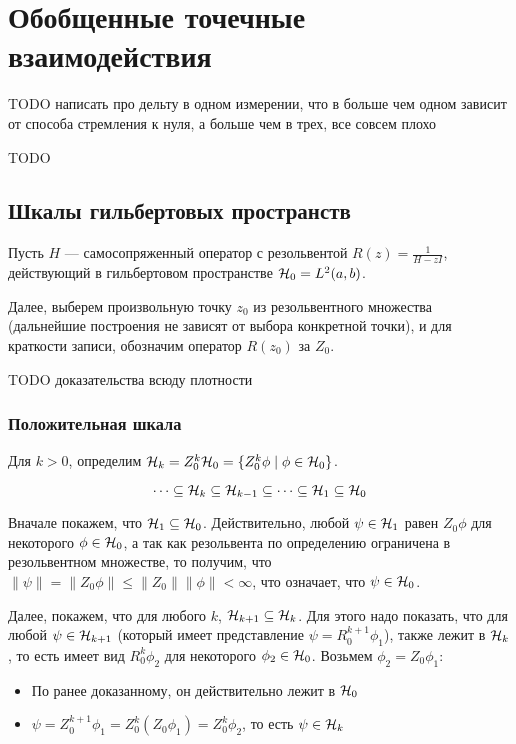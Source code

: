 \section{Обобщенные точечные взаимодействия}

TODO написать про дельту в одном измерении, что в больше чем одном зависит от способа стремления к нуля, а больше чем в трех, все совсем плохо

TODO
\subsection{Шкалы гильбертовых пространств}
Пусть $H$ — самосопряженный оператор с резольвентой $R(z) = \frac{1}{H - z I}$, действующий в гильбертовом пространстве $\mathcal{H}_{0} = L^2(a, b)$.

Далее, выберем произвольную точку $z_0$ из резольвентного множества (дальнейшие построения не зависят от выбора конкретной точки), и для краткости записи, обозначим оператор $R(z_0)$ за $Z_0$.


TODO доказательства всюду плотности
\subsubsection{Положительная шкала}
Для $k > 0$, определим $\mathcal{H}_{k} = Z_0^k \mathcal{H}_{0} = \{ Z_0^k \phi \mid \phi \in \mathcal{H}_{0} \}$.

\begin{prop}
\[
\dots \subseteq \mathcal{H}_{k} \subseteq \mathcal{H}_{k - 1} \subseteq \dots \subseteq \mathcal{H}_{1} \subseteq{\mathcal{H}_{0}}
\]
\end{prop}
Вначале покажем, что $\mathcal{H}_{1} \subseteq \mathcal{H}_{0}$. Действительно, любой $\psi \in \mathcal{H}_{1}$ равен $Z_0 \phi$ для некоторого $\phi \in \mathcal{H}_{0}$, а так как резольвента по определению ограничена в резольвентном множестве, то получим, что $\| \psi \| = \| Z_0 \phi \| \le \|Z_0\| \|\phi\| < \infty$, что означает, что $\psi \in \mathcal{H}_{0}$.

Далее, покажем, что для любого $k$, $\mathcal{H}_{k + 1} \subseteq \mathcal{H}_{k}$. Для этого надо показать, что для любой $\psi \in \mathcal{H}_{k + 1}$ (который имеет представление $\psi = R_0^{k + 1} \phi_1$), также лежит в $\mathcal{H}_{k}$, то есть имеет вид $R_0^k \phi_2$ для некоторого $\phi_2 \in \mathcal{H}_{0}$. Возьмем $\phi_2 = Z_0 \phi_1$:
\begin{itemize}
\item По ранее доказанному, он действительно лежит в $\mathcal{H}_{0}$
\item $\psi = Z_0^{k + 1} \phi_1 = Z_0^k (Z_0 \phi_1) = Z_0^k \phi_2$, то есть $\psi \in \mathcal{H}_{k}$
\end{itemize}


